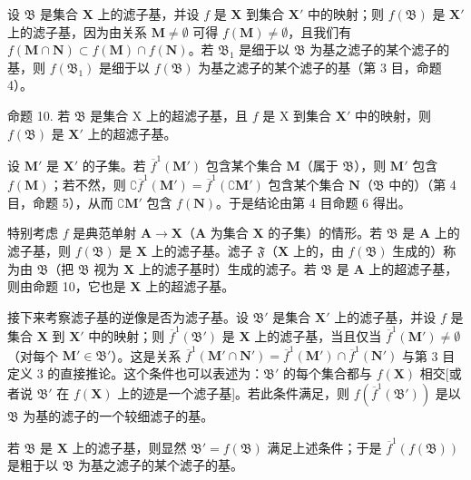 设 \(\mathfrak{B}\) 是集合 \(\mathbf{X}\) 上的滤子基，并设 \(f\) 是 \(\mathbf{X}\) 到集合 \(\mathbf{X}'\) 中的映射；则 \(f(\mathfrak{B})\) 是 \(\mathbf{X}'\) 上的滤子基，因为由关系 \(\mathbf{M} \neq \emptyset\) 可得 \(f(\mathbf{M}) \neq \emptyset\)，且我们有 \(f(\mathbf{M} \cap \mathbf{N}) \subset f(\mathbf{M}) \cap f(\mathbf{N})\)。若 \(\mathfrak{B}_1\) 是细于以 \(\mathfrak{B}\) 为基之滤子的某个滤子的基，则 \(f(\mathfrak{B}_1)\) 是细于以 \(f(\mathfrak{B})\) 为基之滤子的某个滤子的基（第 3 目，命题 4）。

命题 10. 若 \(\mathfrak{B}\) 是集合 X 上的超滤子基，且 \(f\) 是 X 到集合 \(\mathbf{X}'\) 中的映射，则 \(f(\mathfrak{B})\) 是 \(\mathbf{X}'\) 上的超滤子基。

设 \(\mathbf{M}'\) 是 \(\mathbf{X}'\) 的子集。若 \(\overline{f}^{1}(\mathbf{M}')\) 包含某个集合 \(\mathbf{M}\)（属于 \(\mathfrak{B}\)），则 \(\mathbf{M}'\) 包含 \(f(\mathbf{M})\)；若不然，则 \(\complement \overline{f}^{1}(\mathbf{M}') = \overline{f}^{1}(\complement \mathbf{M}')\) 包含某个集合 \(\mathbf{N}\)（\(\mathfrak{B}\) 中的）（第 4 目，命题 5），从而 \(\complement \mathbf{M}'\) 包含 \(f(\mathbf{N})\)。于是结论由第 4 目命题 6 得出。

特别考虑 \(f\) 是典范单射 \(\mathbf{A} \to \mathbf{X}\)（\(\mathbf{A}\) 为集合 \(\mathbf{X}\) 的子集）的情形。若 \(\mathfrak{B}\) 是 \(\mathbf{A}\) 上的滤子基，则 \(f(\mathfrak{B})\) 是 \(\mathbf{X}\) 上的滤子基。滤子 \(\mathfrak{F}\)（\(\mathbf{X}\) 上的，由 \(f(\mathfrak{B})\) 生成的）称为由 \(\mathfrak{B}\)（把 \(\mathfrak{B}\) 视为 \(\mathbf{X}\) 上的滤子基时）生成的滤子。若 \(\mathfrak{B}\) 是 \(\mathbf{A}\) 上的超滤子基，则由命题 10，它也是 \(\mathbf{X}\) 上的超滤子基。

接下来考察滤子基的逆像是否为滤子基。设 \(\mathfrak{B}'\) 是集合 \(\mathbf{X}'\) 上的滤子基，并设 \(f\) 是集合 \(\mathbf{X}\) 到 \(\mathbf{X}'\) 中的映射；则 \(\overline{f}^{1}(\mathfrak{B}')\) 是 \(\mathbf{X}\) 上的滤子基，当且仅当 \(\overline{f}^{1}(\mathbf{M}') \neq \emptyset\)（对每个 \(\mathbf{M}' \in \mathfrak{B}'\)）。这是关系 \(\overline{f}^{1}(\mathbf{M}' \cap \mathbf{N}') = \overline{f}^{1}(\mathbf{M}') \cap \overline{f}^{1}(\mathbf{N}')\) 与第 3 目定义 3 的直接推论。这个条件也可以表述为：\(\mathfrak{B}'\) 的每个集合都与 \(f(\mathbf{X})\) 相交{[}或者说 \(\mathfrak{B}'\) 在 \(f(\mathbf{X})\) 上的迹是一个滤子基{]}。若此条件满足，则 \(f(\overline{f}^{1}(\mathfrak{B}'))\) 是以 \(\mathfrak{B}\) 为基的滤子的一个较细滤子的基。

若 \(\mathfrak{B}\) 是 \(\mathbf{X}\) 上的滤子基，则显然 \(\mathfrak{B}' = f(\mathfrak{B})\) 满足上述条件；于是 \(\overline{f}^1 (f(\mathfrak{B}))\) 是粗于以 \(\mathfrak{B}\) 为基之滤子的某个滤子的基。

